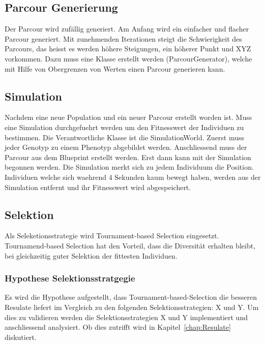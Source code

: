     \subsection{Parcour Generierung\label{sec:Parcour Generierung}}

      Der Parcour wird zufällig generiert. Am Anfang wird ein einfacher und flacher Parcour generiert.
      Mit zunehmenden Iterationen steigt die Schwierigkeit des Parcours, das heisst es werden höhere Steigungen, ein höherer Punkt und XYZ vorkommen.
      Dazu muss eine Klasse erstellt werden (ParcourGenerator), welche mit Hilfe von Obergrenzen von Werten einen Parcour generieren kann.

    \subsection{Simulation}
      Nachdem eine neue Population und ein neuer Parcour erstellt worden ist.
      Muss eine Simulation durchgefuehrt werden um den Fitnesswert der Individuen zu bestimmen.
      Die Verantwortliche Klasse ist die SimulationWorld. Zuerst muss jeder Genotyp zu einem Phenotyp abgebildet werden.
      Anschliessend muss der Parcour aus dem Blueprint erstellt werden. Erst dann kann mit der Simulation begonnen werden.
      Die Simulation merkt sich zu jedem Individuum die Position. Individuen welche sich waehrend 4 Sekunden kaum bewegt haben,
      werden aus der Simulation entfernt und ihr Fitnesswert wird abgespeichert.

    \subsection{Selektion\label{sec:Selektion}}

      Als Seleketionsstrategie wird Tournament-based Selection eingesetzt. Tournamend-based Selection hat den Vorteil,
      dass die Diversität erhalten bleibt, bei gleichzeitig guter Selektion der fittesten Individuen.

      \subsubsection{Hypothese Selektionsstratgegie\label{sub:Hypothese Selektionsstratgegie}}

        Es wird die Hypothese aufgestellt, dass Tournament-based-Selection die besseren Resulate liefert im Vergleich zu den folgenden Selektionsstrategien: X und Y.
        Um dies zu validieren werden die Selektionsstrategien X und Y implementiert und anschliessend analysiert.
        Ob dies zutrifft wird in Kapitel~\ref{chap:Resulate} diskutiert.

